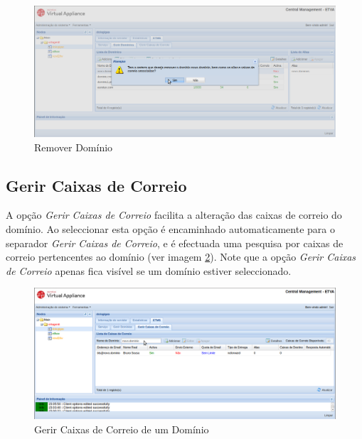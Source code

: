 \begin{figure}[H]
    \begin{center}
    \includegraphics[scale=0.35]{screenshots/etms/etms_delete_domain.png}
    \caption{Remover Domínio}
    \label{fig:etms_delete_domain}
    \end{center}
\end{figure}


\subsection{Gerir Caixas de Correio}
\label{sec:etms_sub_gerir_caixas_dominio}
A opção \textit{Gerir Caixas de Correio} facilita a alteração das caixas de correio do domínio. Ao seleccionar esta opção é encaminhado automaticamente para o separador \textit{Gerir Caixas de Correio}, e é efectuada uma pesquisa por caixas de correio pertencentes ao domínio (ver imagem \ref{fig:etms_gerir_mailboxes}). Note que a opção \textit{Gerir Caixas de Correio} apenas fica visível se um domínio estiver seleccionado.

\begin{figure}[H]
    \begin{center}
    \includegraphics[scale=0.35]{screenshots/etms/etms_gerir_mailboxes.png}
    \caption{Gerir Caixas de Correio de um Domínio}
    \label{fig:etms_gerir_mailboxes}
    \end{center}
\end{figure}


